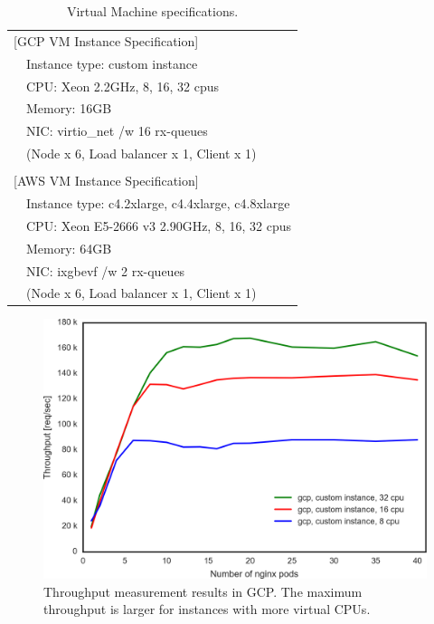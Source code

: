 {
\setlength{\tabcolsep}{3em}
\renewcommand{\arraystretch}{1.1}

\begin{table}[h]
  \centering
  \begin{tabular}{ll}
    \hline 
    \multicolumn{2}{l}{[GCP VM Instance Specification]}   \\
    & Instance type: custom instance \\
    & CPU: Xeon 2.2GHz, 8, 16, 32 cpus \hspace{2cm} \\
    & Memory: 16GB \\
    & NIC: virtio\_net /w 16 rx-queues \\
    & (Node x 6, Load balancer x 1, Client x 1) \\
    & \\
    \multicolumn{2}{l}{[AWS VM Instance Specification]}   \\
    & Instance type: c4.2xlarge, c4.4xlarge, c4.8xlarge  \\
    & CPU: Xeon E5-2666 v3 2.90GHz, 8, 16, 32 cpus \\
    & Memory: 64GB \\
    & NIC: ixgbevf /w 2 rx-queues \\
    & (Node x 6, Load balancer x 1, Client x 1) \\
    \hline
  \end{tabular}
  \caption[Virtual Machine specifications]{Virtual Machine specifications.}
  \label{fig:cloud_machine_spec}
\end{table}
}

\begin{figure}[h]
    \includegraphics[width=0.9\columnwidth]{Figs/gcp_all_ieice}
    \caption[Throughput measurement results in GCP]{
Throughput measurement results in GCP.
The maximum throughput is larger for instances with more virtual CPUs.
    }
    \label{fig:gcp_all_ieice}
\end{figure}


